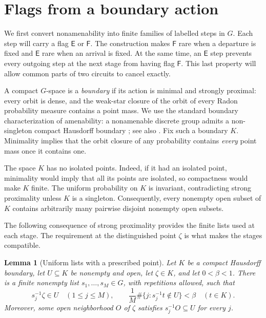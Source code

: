 \documentclass[11pt]{article}
\numberwithin{equation}{section}
\newtheorem{lemma}[theorem]{Lemma}
\theoremstyle{definition}
\theoremstyle{remark}
\newcommand{\E}{\mathsf E}
\newcommand{\F}{\mathsf F}
\begin{document}
\section{Flags from a boundary action}\label{sec:flags}

We first convert nonamenability into finite families of labelled steps in
$G$.  Each step will carry a flag $\E$ or $\F$.  The construction makes $\F$
rare when a departure is fixed and $\E$ rare when an arrival is fixed.
At the same time, an $\E$ step prevents every outgoing step at the next
stage from having flag $\F$.  This last property will allow common parts
of two circuits to cancel exactly.

A compact $G$-space is a \emph{boundary} if its action is minimal and
strongly proximal: every orbit is dense, and the weak-star closure of
the orbit of every Radon probability measure contains a point mass.
We use the standard boundary characterization of amenability: a
nonamenable discrete group admits a non-singleton compact Hausdorff
boundary \cite{Furstenberg}; see also
\cite[Section~3]{KalantarKennedy}. Fix such a boundary $K$.
Minimality implies that the orbit closure of any probability contains
\emph{every} point mass once it contains one.

The space $K$ has no isolated points.  Indeed, if it had an isolated
point, minimality would imply that all its points are isolated, so
compactness would make $K$ finite.  The uniform probability on $K$ is
invariant, contradicting strong proximality unless $K$ is a singleton.
Consequently, every nonempty open subset of $K$ contains arbitrarily
many pairwise disjoint nonempty open subsets.

The following consequence of strong proximality provides the finite
lists used at each stage.  The requirement at the distinguished point
$\zeta$ is what makes the stages compatible.

\begin{lemma}[Uniform lists with a prescribed point]\label{lem:uniform-list}
Let $K$ be a compact Hausdorff boundary, let $U\subseteq K$ be nonempty
and open, let $\zeta\in K$, and let $0<\beta<1$.  There is a finite
nonempty list $s_1,\ldots,s_M\in G$, with repetitions allowed, such that
\[
 s_j^{-1}\zeta\in U\quad(1\leq j\leq M),
 \qquad
 \frac{1}{M}\#\{j:s_j^{-1}t\notin U\}<\beta
 \quad(t\in K).
\]
Moreover, some open neighborhood $O$ of $\zeta$ satisfies
$s_j^{-1}O\subseteq U$ for every $j$.
\end{lemma}
\end{document}
